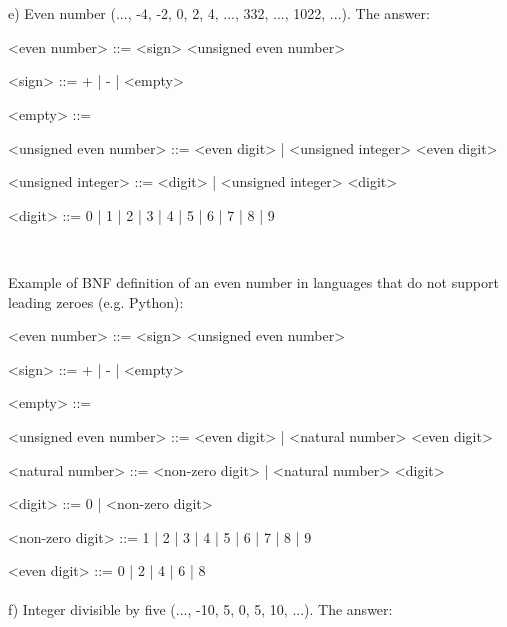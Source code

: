 \documentclass{article}
\begin{document}
	
	
	
	\paragraph{}
	\rmfamily\
	
		e) Even number (..., -4, -2, 0, 2, 4, ..., 332, ..., 1022, ...). The answer:
		
	\ttfamily
	\begin{grammar}
	
		<even number> ::= <sign> <unsigned even number>
	
		<sign> ::= + | - | <empty>
	
		<empty> ::= \
	
		<unsigned even number> ::= <even digit> | <unsigned integer> <even digit>
	
		<unsigned integer> ::= <digit> | <unsigned integer> <digit>

		<digit> ::= 0 | 1 | 2 | 3 | 4 | 5 | 6 | 7 | 8 | 9
	
	\end{grammar}
	
		\rmfamily\
	
		Example of BNF definition of an even number in languages that do not support leading zeroes (e.g. Python):
		
	\ttfamily
	\begin{grammar}
	
		<even number> ::= <sign> <unsigned even number>
	
		<sign> ::= + | - | <empty>
	
		<empty> ::= \
	
		<unsigned even number> ::= <even digit> | <natural number> <even digit>
	
		<natural number> ::= <non-zero digit> | <natural number> <digit>
	
		<digit> ::= 0 | <non-zero digit>
	
		<non-zero digit> ::= 1 | 2 | 3 | 4 | 5 | 6 | 7 | 8 | 9
	
		<even digit> ::= 0 | 2 | 4 | 6 | 8
	
			
	\end{grammar}
	
	
	
	
	\paragraph{}
	\rmfamily
	
		f) Integer divisible by five (..., -10, 5, 0, 5, 10, ...). The answer:
		
\end{document}
